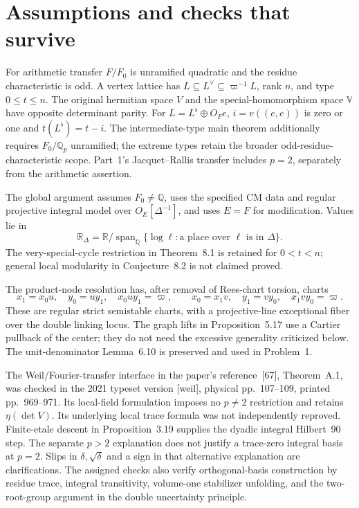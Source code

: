 \documentclass[10pt]{article}
\begin{document}
\section*{Assumptions and checks that survive}
For arithmetic transfer \(F/F_0\) is unramified quadratic and the residue characteristic is odd. A vertex lattice has \(L\subseteq L^\vee\subseteq\varpi^{-1}L\), rank \(n\), and type \(0\le t\le n\). The original hermitian space \(V\) and the special-homomorphism space \(\mathbb V\) have opposite determinant parity. For \(L=L^\flat\oplus O_Fe\), \(i=v((e,e))\) is zero or one and \(t(L^\flat)=t-i\). The intermediate-type main theorem additionally requires \(F_0/\mathbb Q_p\) unramified; the extreme types retain the broader odd-residue-characteristic scope. Part 1’s Jacquet–Rallis transfer includes \(p=2\), separately from the arithmetic assertion.\par
The global argument assumes \(F_0\ne\mathbb Q\), uses the specified CM data and regular projective integral model over \(O_E[\Delta^{-1}]\), and uses \(E=F\) for modification. Values lie in \[\mathbb R_\Delta
 =\mathbb R/\operatorname{span}_{\mathbb Q}
 \{\log\ell:\text{a place over }\ell\text{ is in }\Delta\}.\] The very-special-cycle restriction in Theorem 8.1 is retained for \(0<t<n\); general local modularity in Conjecture 8.2 is not claimed proved.\par
The product-node resolution has, after removal of Rees-chart torsion, charts \[x_1=x_0u,\quad y_0=uy_1,\quad x_0uy_1=\varpi,
 \qquad
 x_0=x_1v,\quad y_1=vy_0,\quad x_1vy_0=\varpi.\] These are regular strict semistable charts, with a projective-line exceptional fiber over the double linking locus. The graph lifts in Proposition 5.17 use a Cartier pullback of the center; they do not need the excessive generality criticized below. The unit-denominator Lemma 6.10 is preserved and used in Problem 1.\par
The Weil/Fourier-transfer interface in the paper’s reference [67], Theorem A.1, was checked in the 2021 typeset version [weil], physical pp. 107–109, printed pp. 969–971. Its local-field formulation imposes no \(p\ne2\) restriction and retains \(\eta(\det V)\). Its underlying local trace formula was not independently reproved. Finite-etale descent in Proposition 3.19 supplies the dyadic integral Hilbert 90 step. The separate \(p>2\) explanation does not justify a trace-zero integral basis at \(p=2\). Slips in \(\delta,\sqrt\delta\) and a sign in that alternative explanation are clarifications. The assigned checks also verify orthogonal-basis construction by residue trace, integral transitivity, volume-one stabilizer unfolding, and the two-root-group argument in the double uncertainty principle.\par
\end{document}
